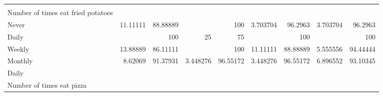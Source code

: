 \documentclass{article}
\begin{document}
\begin{tabular}{lllllllll}
  \multicolumn{1}{|r}{} &
  \multicolumn{1}{r}{} &
  \multicolumn{1}{r}{} &
  \multicolumn{1}{r}{} &
  \multicolumn{1}{r}{} &
  \multicolumn{1}{r}{} &
  \multicolumn{1}{r}{} &
  \multicolumn{1}{r}{} \\
\multicolumn{1}{l}{\hspace{6em}Number of times eat fried potatoes} &
  \multicolumn{1}{|r}{} &
  \multicolumn{1}{r}{} &
  \multicolumn{1}{r}{} &
  \multicolumn{1}{r}{} &
  \multicolumn{1}{r}{} &
  \multicolumn{1}{r}{} &
  \multicolumn{1}{r}{} &
  \multicolumn{1}{r}{} \\
\multicolumn{1}{l}{\hspace{7em}Never} &
  \multicolumn{1}{|r}{11.11111} &
  \multicolumn{1}{r}{88.88889} &
  \multicolumn{1}{r}{} &
  \multicolumn{1}{r}{100} &
  \multicolumn{1}{r}{3.703704} &
  \multicolumn{1}{r}{96.2963} &
  \multicolumn{1}{r}{3.703704} &
  \multicolumn{1}{r}{96.2963} \\
\multicolumn{1}{l}{\hspace{7em}Daily} &
  \multicolumn{1}{|r}{} &
  \multicolumn{1}{r}{100} &
  \multicolumn{1}{r}{25} &
  \multicolumn{1}{r}{75} &
  \multicolumn{1}{r}{} &
  \multicolumn{1}{r}{100} &
  \multicolumn{1}{r}{} &
  \multicolumn{1}{r}{100} \\
\multicolumn{1}{l}{\hspace{7em}Weekly} &
  \multicolumn{1}{|r}{13.88889} &
  \multicolumn{1}{r}{86.11111} &
  \multicolumn{1}{r}{} &
  \multicolumn{1}{r}{100} &
  \multicolumn{1}{r}{11.11111} &
  \multicolumn{1}{r}{88.88889} &
  \multicolumn{1}{r}{5.555556} &
  \multicolumn{1}{r}{94.44444} \\
\multicolumn{1}{l}{\hspace{7em}Monthly} &
  \multicolumn{1}{|r}{8.62069} &
  \multicolumn{1}{r}{91.37931} &
  \multicolumn{1}{r}{3.448276} &
  \multicolumn{1}{r}{96.55172} &
  \multicolumn{1}{r}{3.448276} &
  \multicolumn{1}{r}{96.55172} &
  \multicolumn{1}{r}{6.896552} &
  \multicolumn{1}{r}{93.10345} \\
\multicolumn{1}{l}{\hspace{3em}Daily} &
  \multicolumn{1}{|r}{} &
  \multicolumn{1}{r}{} &
  \multicolumn{1}{r}{} &
  \multicolumn{1}{r}{} &
  \multicolumn{1}{r}{} &
  \multicolumn{1}{r}{} &
  \multicolumn{1}{r}{} &
  \multicolumn{1}{r}{} \\
\multicolumn{1}{l}{\hspace{4em}Number of times eat pizza} &
  \multicolumn{1}{|r}{} &
  \multicolumn{1}{r}{} &
  \multicolumn{1}{r}{} &
  \multicolumn{1}{r}{} &
  \multicolumn{1}{r}{} &

\end{tabular}
\end{document}
